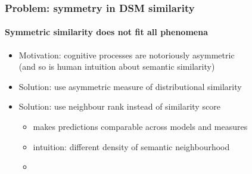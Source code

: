 \documentclass[t]{beamer} %
\begin{document}
\begin{frame}
  \frametitle{Problem: symmetry in DSM similarity}
  \framesubtitle{Symmetric similarity does not fit all phenomena}
  
  \begin{itemize}
  \item Motivation: cognitive processes are notoriously asymmetric\\
    (and so is human intuition about semantic similarity)
  \item Solution: use asymmetric measure of distributional similarity
  \item<2-> Solution: use neighbour rank instead of similarity score
    \begin{itemize}
    \item makes predictions comparable across models and measures
    \item intuition: different density of semantic neighbourhood 
    \item[]
    \end{itemize}
  \end{itemize}


\end{frame}
\end{document}
